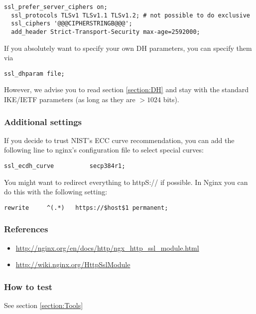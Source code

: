 \begin{lstlisting}[breaklines]
  ssl_prefer_server_ciphers on;
  ssl_protocols TLSv1 TLSv1.1 TLSv1.2; # not possible to do exclusive
  ssl_ciphers '@@@CIPHERSTRINGB@@@';
  add_header Strict-Transport-Security max-age=2592000;
\end{lstlisting}

If you absolutely want to specify your own DH parameters, you can specify them via

\begin{lstlisting}[breaklines]
  ssl_dhparam file;
\end{lstlisting}

However, we advise you to read section \ref{section:DH} and stay with the standard IKE/IETF parameters (as long as they are $ > 1024 $ bits).

\subsubsection{Additional settings}

If you decide to trust NIST's ECC curve recommendation, you can add the following line to nginx's configuration file to select special curves:

\begin{lstlisting}[breaklines]
  ssl_ecdh_curve          secp384r1;
\end{lstlisting}

You might want to redirect everything to httpS:// if possible. In Nginx you can do this with the following setting:

\begin{lstlisting}[breaklines]
  rewrite     ^(.*)   https://$host$1 permanent;
\end{lstlisting}


\subsubsection{References} 
\begin{itemize}
\item \url{http://nginx.org/en/docs/http/ngx_http_ssl_module.html}
\item \url{http://wiki.nginx.org/HttpSslModule}
\end{itemize}

\subsubsection{How to test}
See section \ref{section:Tools}





